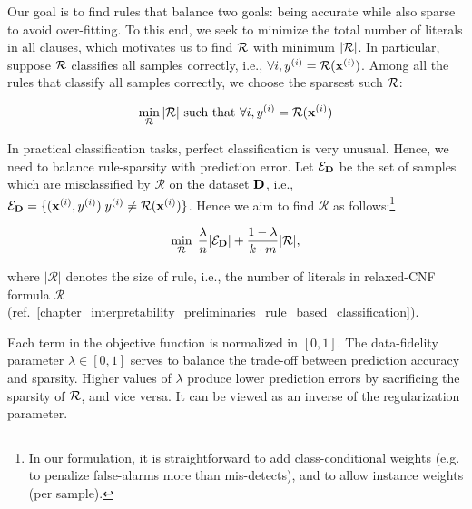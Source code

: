 Our goal is to find rules that balance two 
goals:   being accurate while also sparse to avoid over-fitting.  
To this end, we seek to minimize the total number of literals in all clauses, which motivates us to  find $ {\mathcal{R}}  $ with minimum  $ |{\mathcal{R}}| $. In particular, suppose $ {\mathcal{R}} $ classifies all samples correctly, i.e., $ \forall i, y^{(i)}={\mathcal{R}}(\mathbf{x}^{(i)}) $. Among all the rules that classify all samples correctly,  we choose the sparsest  such $ {\mathcal{R}} $: 


\[
\min\limits_{\mathcal{R}} |\mathcal{R}|\text{ such that }\forall i, y^{(i)}={\mathcal{R}}(\mathbf{x}^{(i)})
\]



In practical classification tasks, perfect classification is very unusual. Hence, we need to balance rule-sparsity with prediction error.  Let $ \mathcal{E}_{\mathbf{D}} $   be  the set of samples which are misclassified  by $ \mathcal{R} $ on the dataset $ \mathbf{D} $, i.e., $ \mathcal{E}_{\mathbf{D}} = \{(\mathbf{x}^{(i)},y^{(i)}) | y^{(i)} \ne \mathcal{R}(\mathbf{x}^{(i)}) \} $. Hence we aim to find $ \mathcal{R} $ as follows:\footnote{In our formulation, it is  straightforward to add class-conditional weights  (e.g. to penalize  false-alarms more than mis-detects), and to allow instance weights (per sample).}

\[
\min\limits_{\mathcal{R}} \;  \frac{\lambda}{n}|\mathcal{E}_{\mathbf{D}}| + \frac{1-\lambda}{k\cdot m} |\mathcal{R}|, 
\]

where $ |\mathcal{R}| $ denotes the size of rule, i.e., the number of literals in relaxed-CNF formula $ \mathcal{R} $ (ref.~\ref{chapter_interpretability_preliminaries_rule_based_classification}).

Each term in the  objective function is normalized in $ [0,1] $. 
The data-fidelity parameter $ \lambda \in [0,1] $  serves to balance
the trade-off between prediction accuracy and sparsity. Higher 
values of $ \lambda $ produce lower prediction errors by sacrificing the sparsity 
of $ {\mathcal{R}} $, and vice versa. It can be viewed as an inverse of the regularization 
parameter. 